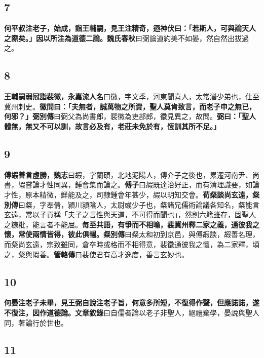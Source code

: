\subsection*{7}

\textbf{何平叔注老子，始成，詣王輔嗣，見王注精奇，迺神伏曰：「若斯人，可與論天人之際矣。」因以所注為道德二論。}{\footnotesize \textbf{魏氏春秋}曰弼論道約美不如晏，然自然出拔過之。}

\subsection*{8}

\textbf{王輔嗣弱冠詣裴徽，}{\footnotesize \textbf{永嘉流人名}曰徽，字文季，河東聞喜人，太常潛少弟也，仕至冀州刺史。}\textbf{徽問曰：「夫無者，誠萬物之所資，聖人莫肯致言，而老子申之無已，何邪？」}{\footnotesize \textbf{弼別傳}曰弼父為尚書郎，裴徽為吏部郎，徽見異之，故問。}\textbf{弼曰：「聖人體無，無又不可以訓，故言必及有，老莊未免於有，恆訓其所不足。」}

\subsection*{9}

\textbf{傅嘏善言虛勝，}{\footnotesize \textbf{魏志}曰嘏，字蘭碩，北地泥陽人，傅介子之後也，累遷河南尹、尚書，嘏嘗論才性同異，鍾會集而論之。\textbf{傅子}曰嘏既達治好正，而有清理識要，如論才性，原本精微，鮮能及之，司隸鍾會年甚少，嘏以明知交會。}\textbf{荀粲談尚玄遠，}{\footnotesize \textbf{粲別傳}曰粲，字奉倩，潁川潁陰人，太尉彧少子也，粲諸兄儒術論議各知名，粲能言玄遠，常以子貢稱「夫子之言性與天道，不可得而聞也」，然則六籍雖存，固聖人之糠粃，能言者不能屈。}\textbf{毎至共語，有爭而不相喻，裴冀州釋二家之義，通彼我之懷，常使兩情皆得，彼此俱暢。}{\footnotesize \textbf{粲別傳}曰粲太和初到京邑，與傅嘏談，嘏善名理，而粲尚玄遠，宗致雖同，倉卒時或格而不相得意，裴徽通彼我之懷，為二家釋，頃之，粲與嘏善。\textbf{管輅傳}曰裴使君有高才逸度，善言玄妙也。}

\subsection*{10}

\textbf{何晏注老子未畢，見王弼自說注老子旨，何意多所短，不復得作聲，但應諾諾，遂不復注，因作道德論。}{\footnotesize \textbf{文章敘錄}曰自儒者論以老子非聖人，絕禮棄學，晏說與聖人同，著論行於世也。}

\subsection*{11}

